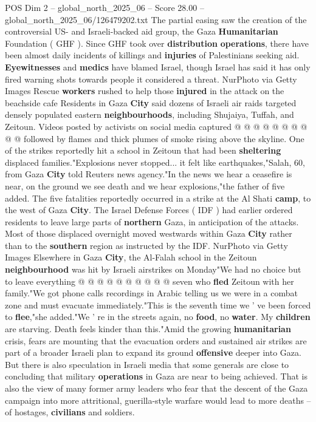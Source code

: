 \begin{textsample}{POS Dim 2 – global\_north\_2025\_06 – Score 28.00 – global\_north\_2025\_06/126479202.txt}
The partial easing saw the creation of the controversial US- and Israeli-backed aid group, the Gaza \textbf{Humanitarian} Foundation ( GHF ).
Since GHF took over \textbf{distribution} \textbf{operations}, there have been almost daily incidents of killings and \textbf{injuries} of Palestinians seeking aid. \textbf{Eyewitnesses} and \textbf{medics} have blamed Israel, though Israel has said it has only fired warning shots towards people it considered a threat.
NurPhoto via Getty Images Rescue \textbf{workers} rushed to help those \textbf{injured} in the attack on the beachside cafe Residents in Gaza \textbf{City} said dozens of Israeli air raids targeted densely populated eastern \textbf{neighbourhoods}, including Shujaiya, Tuffah, and Zeitoun.
Videos posted by activists on social media captured @ @ @ @ @ @ @ @ @ @ followed by flames and thick plumes of smoke rising above the skyline.
One of the strikes reportedly hit a school in Zeitoun that had been \textbf{sheltering} displaced families."Explosions never stopped... it felt like earthquakes,"Salah, 60, from Gaza \textbf{City} told Reuters news agency."In the news we hear a ceasefire is near, on the ground we see death and we hear explosions,"the father of five added.
The five fatalities reportedly occurred in a strike at the Al Shati \textbf{camp}, to the west of Gaza \textbf{City}.
The Israel Defense Forces ( IDF ) had earlier ordered residents to leave large parts of \textbf{northern} Gaza, in anticipation of the attacks.
Most of those displaced overnight moved westwards within Gaza \textbf{City} rather than to the \textbf{southern} region as instructed by the IDF.
NurPhoto via Getty Images Elsewhere in Gaza \textbf{City}, the Al-Falah school in the Zeitoun \textbf{neighbourhood} was hit by Israeli airstrikes on Monday"We had no choice but to leave everything @ @ @ @ @ @ @ @ @ @ seven who \textbf{fled} Zeitoun with her family."We got phone calls recordings in Arabic telling us we were in a combat zone and must evacuate immediately."This is the seventh time we ' ve been forced to \textbf{flee},"she added."We ' re in the streets again, no \textbf{food}, no \textbf{water}.
My \textbf{children} are starving.
Death feels kinder than this."Amid the growing \textbf{humanitarian} crisis, fears are mounting that the evacuation orders and sustained air strikes are part of a broader Israeli plan to expand its ground \textbf{offensive} deeper into Gaza.
But there is also speculation in Israeli media that some generals are close to concluding that military \textbf{operations} in Gaza are near to being achieved.
That is also the view of many former army leaders who fear that the descent of the Gaza campaign into more attritional, guerilla-style warfare would lead to more deaths -- of hostages, \textbf{civilians} and soldiers.

\end{textsample}
